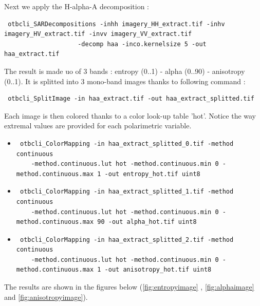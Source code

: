 Next we apply the H-alpha-A decomposition :

\begin{verbatim} otbcli_SARDecompositions -inhh imagery_HH_extract.tif -inhv imagery_HV_extract.tif -invv imagery_VV_extract.tif 
					-decomp haa -inco.kernelsize 5 -out haa_extract.tif \end{verbatim}

The result is made uo of 3 bands : entropy (0..1) - alpha (0..90) - anisotropy (0..1). 
It is splitted into 3 mono-band images thanks to following command :

\begin{verbatim} otbcli_SplitImage -in haa_extract.tif -out haa_extract_splitted.tif \end{verbatim}

Each image is then colored thanks to a color look-up table 'hot'. 
Notice the way extremal values are provided for each polarimetric variable.

\begin{itemize}
\item \begin{verbatim} otbcli_ColorMapping -in haa_extract_splitted_0.tif -method continuous 
    -method.continuous.lut hot -method.continuous.min 0 -method.continuous.max 1 -out entropy_hot.tif uint8 \end{verbatim}
									  
\item \begin{verbatim} otbcli_ColorMapping -in haa_extract_splitted_1.tif -method continuous 
    -method.continuous.lut hot -method.continuous.min 0 -method.continuous.max 90 -out alpha_hot.tif uint8 \end{verbatim}
									  
\item \begin{verbatim} otbcli_ColorMapping -in haa_extract_splitted_2.tif -method continuous 
    -method.continuous.lut hot -method.continuous.min 0 -method.continuous.max 1 -out anisotropy_hot.tif uint8 \end{verbatim}
\end{itemize}

The results are shown in the figures below (\ref{fig:entropyimage} , \ref{fig:alphaimage} and \ref{fig:anisotropyimage}).

